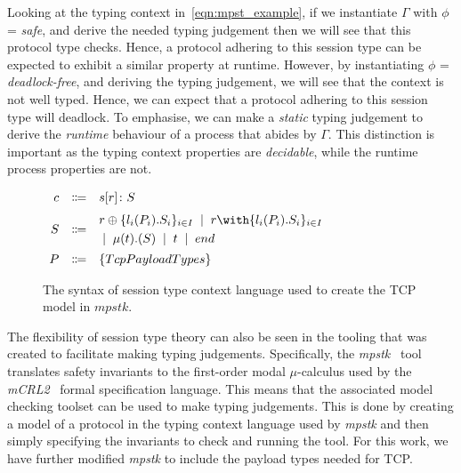 Looking at the typing context in~\ref{eqn:mpst_example}, if we instantiate \textbf{\ensuremath{\Gamma}} with \textit{\ensuremath{\phi}} = \textit{safe}, and derive the needed typing judgement then we will see that this protocol type checks.
Hence, a protocol adhering to this session type can be expected to exhibit a similar property at runtime. 
However, by instantiating \textit{\ensuremath{\phi}} = \textit{deadlock-free}, and deriving the typing judgement, we will see that the context is not well typed.
Hence, we can expect that a protocol adhering to this session type will deadlock.
To emphasise, we can make a \textit{static} typing judgement to derive the \textit{runtime} behaviour of a process that abides by \textbf{\ensuremath{\Gamma}}.
This distinction is important as the typing context properties are \textit{decidable}, while the runtime process properties are not.

\begin{figure}[H]
    \centering
        $
        \begin{array}{rclll}
        \ensuremath{c} & \Coloneqq & \ensuremath{s[r] \colon S} \\[\medskipamount]
        \ensuremath{S}
        & \Coloneqq & 
        \begin{array}{@{}l}
                \ensuremath{r \oplus \{l_i(P_i).S_i\}_{i \in I}}
                \sep        \ensuremath{r \with \{l_i(P_i).S_i\}_{i \in I}} \\[\smallskipamount]
                \sep        \ensuremath{\mu(t).(S)}
                \sep        \ensuremath{t}
                \sep        \ensuremath{end}
        \end{array} \\[\bigskipamount]
        \ensuremath{P}
            & \Coloneqq & \ensuremath{\{TcpPayloadTypes\}}
        \end{array}
        $
    \caption{The syntax of session type context language used to create the TCP model in \ensuremath{mpstk}.} \label{fig:syntax}
\end{figure}

The flexibility of session type theory can also be seen in the tooling that was created to facilitate making typing judgements.
Specifically, the \textit{mpstk}~\cite{SY19} tool translates safety invariants to the first-order modal $\mu$-calculus used by the \textit{mCRL2}~\cite{BGKLNVWWW19} formal specification language.
This means that the associated model checking toolset can be used to make typing judgements.
This is done by creating a model of a protocol in the typing context language used by \textit{mpstk} and then simply specifying the invariants to check and running the tool.
For this work, we have further modified \textit{mpstk} to include the payload types needed for TCP.

